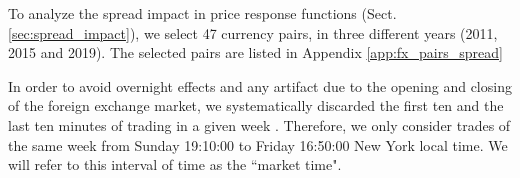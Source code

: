 To analyze the spread impact in price response functions (Sect.
\ref{sec:spread_impact}), we select 47 currency pairs, in three different years
(2011, 2015 and 2019). The selected pairs are listed in Appendix
\ref{app:fx_pairs_spread}

In order to avoid overnight effects and any artifact due to the opening and
closing of the foreign exchange market, we systematically discarded the first
ten and the last ten minutes of trading in a given week
\cite{Bouchaud_2004,large_prices_changes,spread_changes_affect,my_paper_response_financial,Wang_2016_cross}.
Therefore, we only consider trades of the same week from Sunday 19:10:00 to
Friday 16:50:00 New York local time. We will refer to this interval of time as
the ``market time".
